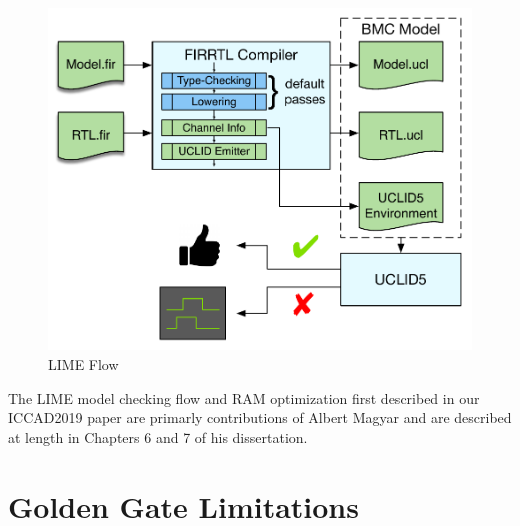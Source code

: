 \begin{figure}
  \centering
    \includegraphics[width=\columnwidth]{figures/lime_flow_small.pdf}
    \caption{LIME Flow}
    \vspace*{-4mm}
  \label{fig:lime-flow}
\end{figure}


The LIME model checking flow and RAM optimization first described in our
ICCAD2019 paper are primarly contributions of Albert Magyar and are described
at length in Chapters 6 and 7 of his dissertation.

\section{Golden Gate Limitations}


